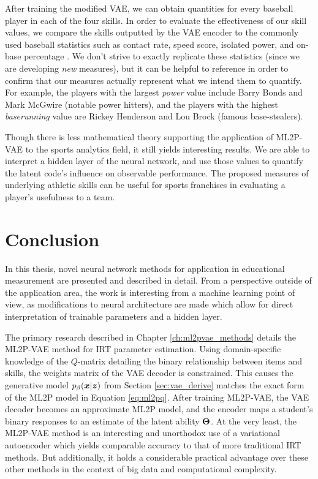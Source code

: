 After training the modified VAE, we can obtain quantities for every baseball player in each of the four skills. In order to evaluate the effectiveness of our skill values, we compare the skills outputted by the VAE encoder to the commonly used baseball statistics such as contact rate, speed score, isolated power, and on-base percentage \cite{baseball_reference}. We don't strive to exactly replicate these statistics (since we are developing \textit{new} measures), but it can be helpful to reference in order to confirm that our measures actually represent what we intend them to quantify. For example, the players with the largest \textit{power} value include Barry Bonds and Mark McGwire (notable power hitters), and the players with the highest \textit{baserunning} value are Rickey Henderson and Lou Brock (famous base-stealers).

Though there is less mathematical theory supporting the application of ML2P-VAE to the sports analytics field, it still yields interesting results. We are able to interpret a hidden layer of the neural network, and use those values to quantify the latent code's influence on observable performance. The proposed measures of underlying athletic skills can be useful for sports franchises in evaluating a player's usefulness to a team.

\section{Conclusion}

In this thesis, novel neural network methods for application in educational measurement are presented and described in detail. From a perspective outside of the application area, the work is interesting from a machine learning point of view, as modifications to neural architecture are made which allow for direct interpretation of trainable parameters and a hidden layer.

The primary research described in Chapter \ref{ch:ml2pvae_methods} details the ML2P-VAE method for IRT parameter estimation. Using domain-specific knowledge of the $Q$-matrix detailing the binary relationship between items and skills, the weights matrix of the VAE decoder is constrained. This causes the generative model $p_\beta(\boldsymbol{x} | \boldsymbol{z})$ from Section \ref{sec:vae_derive} matches the exact form of the ML2P model in Equation \ref{eq:ml2pq}. After training ML2P-VAE, the VAE decoder becomes an approximate ML2P model, and the encoder maps a student's binary responses to an estimate of the latent ability $\boldsymbol{\Theta}$. At the very least, the ML2P-VAE method is an interesting and unorthodox use of a variational autoencoder which yields comparable accuracy to that of more traditional IRT methods. But additionally, it holds a considerable practical advantage over these other methods in the context of big data and computational complexity.

